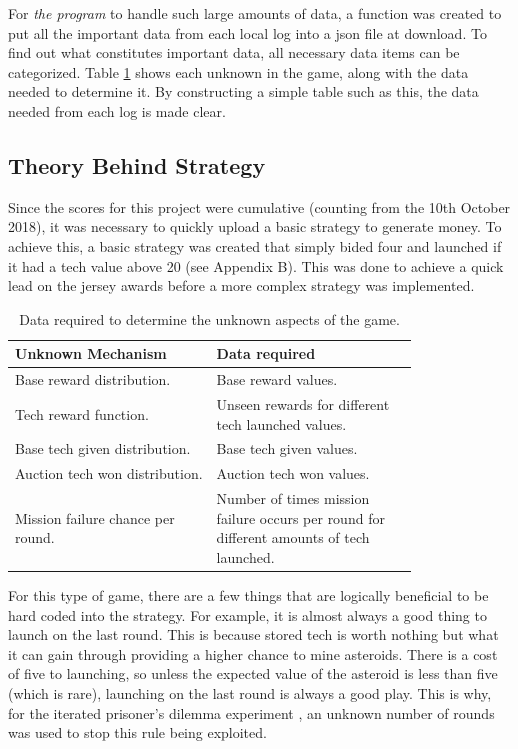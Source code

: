 \documentclass[11pt, twoside]{article}
\begin{document}
For \textit{the program} to handle such large amounts of data, a function was created to put all the important data from each local log into a json file at download. To find out what constitutes important data, all necessary data items can be categorized. Table \ref{tab:data} shows each unknown in the game, along with the data needed to determine it. By constructing a simple table such as this, the data needed from each log is made clear.

\subsection{Theory Behind Strategy} \label{Section22}
Since the scores for this project were cumulative (counting from the 10th October 2018), it was necessary to quickly upload a basic strategy to generate money. To achieve this, a basic strategy was created that simply bided four and launched if it had a tech value above 20 (see Appendix B). This was done to achieve a quick lead on the jersey awards before a more complex strategy was implemented.

\begin{table}
	\centering
	\caption{Data required to determine the unknown aspects of the game.}
	\label{tab:data}
	\begin{tabular}{p{0.4\linewidth}>{\raggedright\arraybackslash}p{0.4\linewidth}}
		\toprule
		\textbf{Unknown Mechanism} & \textbf{Data required} \\
		\midrule
		Base reward distribution. & Base reward values. \\
		Tech reward function. & Unseen rewards for different tech launched values. \\
		Base tech given distribution. & Base tech given values. \\
		Auction tech won distribution. & Auction tech won values. \\
		Mission failure chance per round. & Number of times mission failure occurs per round for different amounts of tech launched. \\
		\bottomrule
	\end{tabular}
\end{table}

For this type of game, there are a few things that are logically beneficial to be hard coded into the strategy. For example, it is almost always a good thing to launch on the last round. This is because stored tech is worth nothing but what it can gain through providing a higher chance to mine asteroids. There is a cost of five to launching, so unless the expected value of the asteroid is less than five (which is rare), launching on the last round is always a good play. This is why, for the iterated prisoner’s dilemma experiment  \cite{bicchieri1997dynamics}, an unknown number of rounds was used to stop this rule being exploited.
\end{document}
